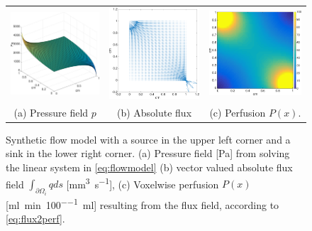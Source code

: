 \documentclass[paper=a4, fontsize=11pt,parskip=half,headings=small]{scrartcl}
\newcommand{\siqt}{\milli\meter\cubed\per\second}
\newcommand{\siPn}{\milli\litre\per\minute\per100\milli\litre}
\begin{document}
	\begin{figure}[H]
		\centering
		\begin{tabular}{c c c}
			\includegraphics[width=.3\textwidth]{figs/pressure.eps} & \includegraphics[width=.3\textwidth]{figs/flowQuiver.eps} & \includegraphics[width=.3\textwidth]{figs/perfusion.eps}\\
			(a) Pressure field $p$ & (b) Absolute flux & (c) Perfusion $P(x)$.
		\end{tabular}
    	\caption{Synthetic flow model with a source in the upper left corner and a sink in the lower right corner. (a) Pressure field [\si{\pascal}] from solving the linear system in \eqref{eq:flowmodel}  (b) vector valued absolute flux field $\int_{\partial \Omega_i}q ds$ [\si{\siqt}], (c) Voxelwise perfusion $P(x)$ [\si{\siPn}] resulting from  the flux field, according to \eqref{eq:flux2perf}.}
	        \label{fig:flowpressureperfusion}
	\end{figure}
	
\end{document}
